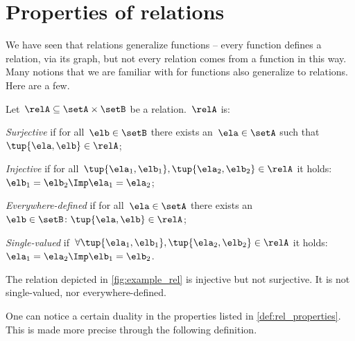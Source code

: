 

\section{Properties of relations}

We have seen that relations generalize functions -- every function defines a relation, via its graph, but not every relation comes from a function in this way. Many notions that we are familiar with for functions also generalize to relations. Here are a few. 

\begin{definition}
  \label{def:rel_properties}
  Let~$\relA\subseteq \setA \times \setB$ be a relation.~$\relA$ is:
  \begin{compactenum}
    \item \emph{Surjective} if for all~$\elb\in \setB$ there exists an~$\ela\in \setA$ such that~$\tup{\ela,\elb}\in \relA$;
    \item \emph{Injective} if for all~$ \tup{\ela_1,\elb_1},\tup{\ela_2,\elb_2}\in \relA$ it holds:~$\elb_1=\elb_2 \Imp \ela_1=\ela_2$;
    \item \emph{Everywhere-defined} if for all~$\ela\in \setA$ there exists an ~$\elb \in \setB\colon \tup{\ela,\elb}\in \relA$;
    \item \emph{Single-valued} if~$\forall \tup{\ela_1,\elb_1},\tup{\ela_2,\elb_2}\in \relA$ it holds:~$\ela_1=\ela_2\Imp \elb_1=\elb_2$.
  \end{compactenum}
\end{definition}

\begin{example}
  The relation depicted in \cref{fig:example_rel} is injective but not surjective. It is not single-valued, nor everywhere-defined. \end{example}

One can notice a certain duality in the properties listed in \cref{def:rel_properties}. This is made more precise through the following definition.

